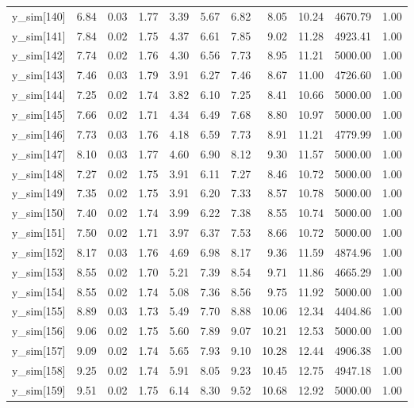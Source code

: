 \begin{table}[ht]
\begin{tabular}{rrrrrrrrrrr}
  y\_sim[140] & 6.84 & 0.03 & 1.77 & 3.39 & 5.67 & 6.82 & 8.05 & 10.24 & 4670.79 & 1.00 \\ 
  y\_sim[141] & 7.84 & 0.02 & 1.75 & 4.37 & 6.61 & 7.85 & 9.02 & 11.28 & 4923.41 & 1.00 \\ 
  y\_sim[142] & 7.74 & 0.02 & 1.76 & 4.30 & 6.56 & 7.73 & 8.95 & 11.21 & 5000.00 & 1.00 \\ 
  y\_sim[143] & 7.46 & 0.03 & 1.79 & 3.91 & 6.27 & 7.46 & 8.67 & 11.00 & 4726.60 & 1.00 \\ 
  y\_sim[144] & 7.25 & 0.02 & 1.74 & 3.82 & 6.10 & 7.25 & 8.41 & 10.66 & 5000.00 & 1.00 \\ 
  y\_sim[145] & 7.66 & 0.02 & 1.71 & 4.34 & 6.49 & 7.68 & 8.80 & 10.97 & 5000.00 & 1.00 \\ 
  y\_sim[146] & 7.73 & 0.03 & 1.76 & 4.18 & 6.59 & 7.73 & 8.91 & 11.21 & 4779.99 & 1.00 \\ 
  y\_sim[147] & 8.10 & 0.03 & 1.77 & 4.60 & 6.90 & 8.12 & 9.30 & 11.57 & 5000.00 & 1.00 \\ 
  y\_sim[148] & 7.27 & 0.02 & 1.75 & 3.91 & 6.11 & 7.27 & 8.46 & 10.72 & 5000.00 & 1.00 \\ 
  y\_sim[149] & 7.35 & 0.02 & 1.75 & 3.91 & 6.20 & 7.33 & 8.57 & 10.78 & 5000.00 & 1.00 \\ 
  y\_sim[150] & 7.40 & 0.02 & 1.74 & 3.99 & 6.22 & 7.38 & 8.55 & 10.74 & 5000.00 & 1.00 \\ 
  y\_sim[151] & 7.50 & 0.02 & 1.71 & 3.97 & 6.37 & 7.53 & 8.66 & 10.72 & 5000.00 & 1.00 \\ 
  y\_sim[152] & 8.17 & 0.03 & 1.76 & 4.69 & 6.98 & 8.17 & 9.36 & 11.59 & 4874.96 & 1.00 \\ 
  y\_sim[153] & 8.55 & 0.02 & 1.70 & 5.21 & 7.39 & 8.54 & 9.71 & 11.86 & 4665.29 & 1.00 \\ 
  y\_sim[154] & 8.55 & 0.02 & 1.74 & 5.08 & 7.36 & 8.56 & 9.75 & 11.92 & 5000.00 & 1.00 \\ 
  y\_sim[155] & 8.89 & 0.03 & 1.73 & 5.49 & 7.70 & 8.88 & 10.06 & 12.34 & 4404.86 & 1.00 \\ 
  y\_sim[156] & 9.06 & 0.02 & 1.75 & 5.60 & 7.89 & 9.07 & 10.21 & 12.53 & 5000.00 & 1.00 \\ 
  y\_sim[157] & 9.09 & 0.02 & 1.74 & 5.65 & 7.93 & 9.10 & 10.28 & 12.44 & 4906.38 & 1.00 \\ 
  y\_sim[158] & 9.25 & 0.02 & 1.74 & 5.91 & 8.05 & 9.23 & 10.45 & 12.75 & 4947.18 & 1.00 \\ 
  y\_sim[159] & 9.51 & 0.02 & 1.75 & 6.14 & 8.30 & 9.52 & 10.68 & 12.92 & 5000.00 & 1.00 \\ 

\end{tabular}
\end{table}
